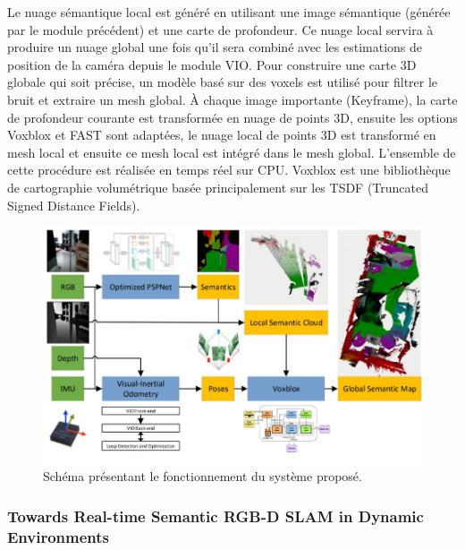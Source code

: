 \documentclass[11pt]{article}
\begin{document}
  Le nuage sémantique local est généré en utilisant une image sémantique (générée par le module précédent) et une carte de profondeur. 
  Ce nuage local servira à produire un nuage global une fois qu'il sera combiné avec les estimations de position de la caméra depuis le module VIO.
  Pour construire une carte 3D globale qui soit précise, un modèle basé sur des voxels est utilisé pour filtrer le bruit et extraire un mesh global.
  À chaque image importante (Keyframe), la carte de profondeur courante est transformée en nuage de points 3D, ensuite les options Voxblox et FAST
  sont adaptées, le nuage local de points 3D est transformé en mesh local et ensuite ce mesh local est intégré dans le mesh global. L'ensemble de 
  cette procédure est réalisée en temps réel sur CPU. Voxblox est une bibliothèque de cartographie volumétrique basée principalement 
  sur les TSDF (Truncated Signed Distance Fields).

  \begin{figure}[hbt]  
    \includegraphics[width=\textwidth]{PipelineP2.png}    
    \caption{Schéma présentant le fonctionnement du système proposé.}
    \label{fig:PipelineP2}
  \end{figure} 
  
  \pagebreak  

  \subsubsection{Towards Real-time Semantic RGB-D SLAM in Dynamic Environments} 
\end{document}
